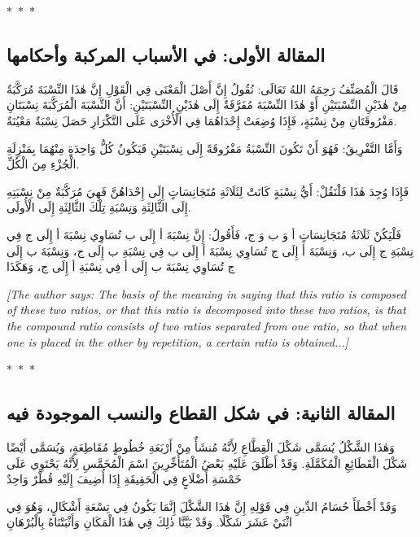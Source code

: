\documentclass[11pt,a4paper]{article}
\theoremstyle{plain}
\theoremstyle{definition}
\theoremstyle{remark}
\newcommand{\ar}[1]{{\arabicfont\beginR #1\endR}}
\newcommand{\ornament}{\begin{center}\textcolor{goldaccent}{$\ast$~$\ast$~$\ast$}\end{center}}
\begin{document}
\ornament

\subsection*{\ar{المقالة الأولى: في الأسباب المركبة وأحكامها}}

\ar{قَالَ الْمُصَنِّفُ رَحِمَهُ اللهُ تَعَالَى: نُقُولُ إِنَّ أَصْلَ الْمَعْنَى فِي الْقَوْلِ إِنَّ هٰذَا النِّسْبَةَ مُرَكَّبَةٌ مِنْ هٰذَيْنِ النِّسْبَتَيْنِ أَوْ هٰذَا النِّسْبَةَ مُفَرَّقَةٌ إِلَى هٰذَيْنِ النِّسْبَتَيْنِ: أَنَّ النِّسْبَةَ الْمُرَكَّبَةَ نِسْبَتَانِ مَفْرُوقَتَانِ مِنْ نِسْبَةٍ، فَإِذَا وُضِعَتْ إِحْدَاهُمَا فِي الْأُخْرَى عَلَى التَّكْرَارِ حَصَلَ نِسْبَةٌ مَعْيُنَةٌ.

وَأَمَّا التَّفْرِيقُ: فَهُوَ أَنْ تَكُونَ النِّسْبَةُ مَفْرُوقَةً إِلَى نِسْبَتَيْنِ فَيَكُونُ كُلُّ وَاحِدَةٍ مِنْهُمَا بِمَنْزِلَةِ الْجُزْءِ مِنَ الْكُلِّ.

فَإِذَا وُجِدَ هٰذَا فَلْنَقُلْ: أَيُّ نِسْبَةٍ كَانَتْ لِثَلَاثَةِ مُتَجَانِسَاتٍ إِلَى إِحْدَاهُنَّ فَهِيَ مُرَكَّبَةٌ مِنْ نِسْبَتِهِ إِلَى الثَّالِثَةِ وَنِسْبَةِ تِلْكَ الثَّالِثَةِ إِلَى الْأُولَى.

فَلْيَكُنْ ثَلَاثَةُ مُتَجَانِسَاتٍ أ وَ ب وَ ج، فَأَقُولُ: إِنَّ نِسْبَةَ أ إِلَى ب تُسَاوِي نِسْبَةَ أ إِلَى ج فِي نِسْبَةِ ج إِلَى ب، وَنِسْبَةَ أ إِلَى ج تُسَاوِي نِسْبَةَ أ إِلَى ب فِي نِسْبَةِ ب إِلَى ج، وَنِسْبَةَ ب إِلَى ج تُسَاوِي نِسْبَةَ ب إِلَى أ فِي نِسْبَةِ أ إِلَى ج، وَهَكَذَا}

\vspace{0.3cm}
\noindent\textcolor{notecolor}{\textit{[The author says: The basis of the meaning in saying that this ratio is composed of these two ratios, or that this ratio is decomposed into these two ratios, is that the compound ratio consists of two ratios separated from one ratio, so that when one is placed in the other by repetition, a certain ratio is obtained...]}}

\ornament

\subsection*{\ar{المقالة الثانية: في شكل القطاع والنسب الموجودة فيه}}

\ar{وَهٰذَا الشَّكْلُ يُسَمَّى شَكْلَ الْقِطَّاعِ لِأَنَّهُ مُنشَأٌ مِنْ أَرْبَعَةِ خُطُوطٍ مُقَاطِعَةٍ، وَيُسَمَّى أَيْضًا شَكْلَ الْقَطَائِعِ الْمُكَمَّلَةِ. وَقَدْ أَطْلَقَ عَلَيْهِ بَعْضُ الْمُتَأَخِّرِينَ اسْمَ الْمُخَمَّسِ لِأَنَّهُ يَحْتَوِي عَلَى خَمْسَةِ أَضْلَاعٍ فِي الْحَقِيقَةِ إِذَا أُضِيفَ إِلَيْهِ قُطْرٌ وَاحِدٌ

وَقَدْ أَخْطَأَ حُسَامُ الدِّينِ فِي قَوْلِهِ إِنَّ هٰذَا الشَّكْلَ إِنَّمَا يَكُونُ فِي تِسْعَةِ أَشْكَالٍ، وَهُوَ فِي اثْنَيْ عَشَرَ شَكْلًا. وَقَدْ بَيَّنَّا ذٰلِكَ فِي هٰذَا الْمَكَانِ وَأَثْبَتْنَاهُ بِالْبُرْهَانِ}
\end{document}

